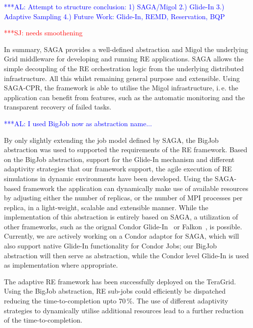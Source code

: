 \documentclass{rspublic}
\newcommand{\alnote}[1]{ {\textcolor{blue} { ***AL: #1 }}}
\newcommand{\jhanote}[1]{ {\textcolor{red} { ***SJ: #1 }}}
\newcommand{\alnote}[1]{}
\newcommand{\jhanote}[1]{}
\begin{document}
                    
\alnote{Attempt to structure conclusion: 1) SAGA/Migol 2.) Glide-In
  3.) Adaptive Sampling 4.) Future Work: Glide-In, REMD, Reservation,
  BQP}
                                         
\jhanote{needs smoothening} 

In summary, SAGA provides a well-defined abstraction and Migol the
underlying Grid middleware for developing and running RE applications.
SAGA allows the simple decoupling of the RE orchestration logic from
the underlying distributed infrastructure. All this whilst remaining
general purpose and extensible.  Using SAGA-CPR, the framework is able
to utilise the Migol infrastructure, i.\,e. the application can
benefit from features, such as the automatic monitoring and the
transparent recovery of failed tasks.

                 
\alnote{I used BigJob now as abstraction name...}  

By only slightly extending the job model defined by SAGA, the BigJob
abstraction was used to supported the requirements of the RE
framework.
Based on the BigJob abstraction, support for the Glide-In mechanism
and different adaptivity strategies that our framework support, the
agile execution of RE simulations in dynamic environments have been
developed. Using the SAGA-based framework the application can
dynamically make use of available resources by adjusting either the
number of replicas, or the number of MPI processes per replica, in a
light-weight, scalable and extensible manner.
While the implementation of this abstraction is entirely based on
SAGA, a utilization of other frameworks, such as the orignal Condor
Glide-In~\citep{citeulike:291860} or Falkon~\citep{1362680}, is
possible. Currently, we are actively working on a Condor adaptor for
SAGA, which will also support native Glide-In functionality for Condor
Jobs; our BigJob abstraction will then serve as abstraction, while the
Condor level Glide-In is used as implementation where appropriate.

The adaptive RE framework has been successfully deployed on
the TeraGrid. 
Using the BigJob abstraction, RE sub-jobs could efficiently be dispatched 
reducing the time-to-completion upto 70\,\%. The use of different 
adaptivity strategies to dynamically utilise additional resources lead 
to a further reduction of the time-to-completion.
\end{document}
